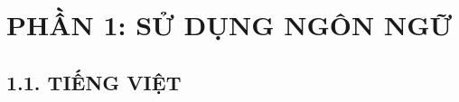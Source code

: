 \documentclass[12pt,a4paper]{article}
\begin{document}
\pagestyle{fancy}
\makeexamheader
\section*{PHẦN 1: SỬ DỤNG NGÔN NGỮ}
\subsection*{1.1. TIẾNG VIỆT}

\end{document}
